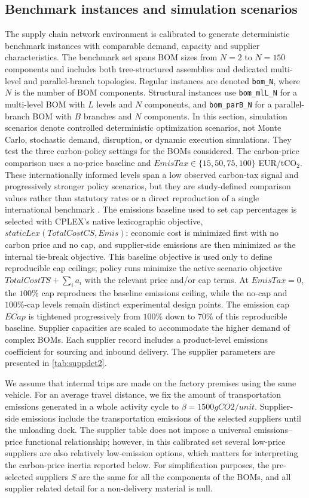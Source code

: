 \documentclass[preprint,12pt,authoryear]{elsarticle}
\begin{document}
\subsection{Benchmark instances and simulation scenarios}
The supply chain network environment is calibrated to generate deterministic benchmark instances with comparable demand, capacity and supplier characteristics. The benchmark set spans BOM sizes from $N=2$ to $N=150$ components and includes both tree-structured assemblies and dedicated multi-level and parallel-branch topologies. Regular instances are denoted \texttt{bom\_N}, where $N$ is the number of BOM components. Structural instances use \texttt{bom\_mlL\_N} for a multi-level BOM with $L$ levels and $N$ components, and \texttt{bom\_parB\_N} for a parallel-branch BOM with $B$ branches and $N$ components. In this section, simulation scenarios denote controlled deterministic optimization scenarios, not Monte Carlo, stochastic demand, disruption, or dynamic execution simulations. They test the three carbon-policy settings for the BOMs considered. The carbon-price comparison uses a no-price baseline and $EmisTax\in\{15,50,75,100\}$ EUR/tCO$_2$. These internationally informed levels span a low observed carbon-tax signal and progressively stronger policy scenarios, but they are study-defined comparison values rather than statutory rates or a direct reproduction of a single international benchmark \citep{OECD2025ECR,HighLevelCommission2017}. The emissions baseline used to set cap percentages is selected with CPLEX's native lexicographic objective, $staticLex(TotalCostCS, Emis)$: economic cost is minimized first with no carbon price and no cap, and supplier-side emissions are then minimized as the internal tie-break objective. This baseline objective is used only to define reproducible cap ceilings; policy runs minimize the active scenario objective $TotalCostTS+\sum_i a_i$ with the relevant price and/or cap terms. At $EmisTax=0$, the $100\%$ cap reproduces the baseline emissions ceiling, while the no-cap and $100\%$-cap levels remain distinct experimental design points. The emission cap $ECap$ is tightened progressively from $100\%$ down to $70\%$ of this reproducible baseline.
Supplier capacities are scaled to accommodate the higher demand of complex BOMs. Each supplier record includes a product-level emissions coefficient for sourcing and inbound delivery. The supplier parameters are presented in \cref{tab:suppdet2}.

We assume that internal trips are made on the factory premises using the same vehicle. For an average travel distance, we fix the amount of transportation emissions generated in a whole activity cycle to $\beta = 1500 gCO2/unit$. Supplier-side emissions include the transportation emissions of the selected suppliers until the unloading dock. The supplier table does not impose a universal emissions--price functional relationship; however, in this calibrated set several low-price suppliers are also relatively low-emission options, which matters for interpreting the carbon-price inertia reported below. For simplification purposes, the pre-selected suppliers $S$ are the same for all the components of the BOMs, and all supplier related detail for a non-delivery material is null.
\end{document}
